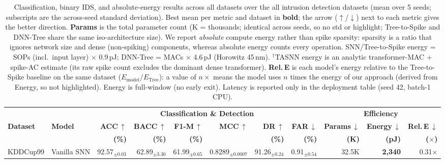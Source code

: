 \begin{table}[!ht]
\centering
\renewcommand{\arraystretch}{1.1}
\caption{Classification, binary IDS, and absolute-energy results across all datasets over the all intrusion detection datasets (mean over 5 seeds; subscripts are the across-seed standard deviation). Best mean per metric and dataset in \colorbox{bestcell}{\textbf{bold}}; the arrow ($\uparrow$/$\downarrow$) next to each metric gives the better direction. \textbf{Params} is the total parameter count (K = thousands; identical across seeds, so no std or highlight; Tree-to-Spike and DNN-Tree share the same iso-architecture size). We report \emph{absolute} compute energy rather than spike sparsity: sparsity is a ratio that ignores network size and dense (non-spiking) components, whereas absolute energy counts every operation. SNN/Tree-to-Spike energy = SOPs (incl.\ input layer) $\times$ 0.9\,pJ; DNN-Tree = MACs $\times$ 4.6\,pJ (Horowitz 45\,nm). $^\dagger$TASNN energy is an analytic transformer-MAC + spike-AC estimate (its raw spike count excludes the dominant dense transformer). \textbf{Rel.\,E} is each model's energy relative to the Tree-to-Spike baseline on the same dataset ($E_{\mathrm{model}}/E_{\mathrm{Tree}}$): a value of $n\times$ means the model uses $n$ times the energy of our approach (derived from Energy, so not highlighted). Energy is full-window (no early exit). Latency is reported only in the deployment table (seed 42, batch-1 CPU).}
\label{tab:results_full}
{\scriptsize
\begin{tabular}{l l r r r r r r r r r}
\toprule
& & \multicolumn{6}{c}{\textbf{Classification \& Detection}} & \multicolumn{3}{c}{\textbf{Efficiency}} \\
\cmidrule(lr){3-8} \cmidrule(lr){9-11}
\textbf{Dataset} & \textbf{Model} & \textbf{ACC}\,$\uparrow$ & \textbf{BACC}\,$\uparrow$ & \textbf{F1-M}\,$\uparrow$ & \textbf{MCC}\,$\uparrow$ & \textbf{DR}\,$\uparrow$ & \textbf{FAR}\,$\downarrow$ & \textbf{Params}\,$\downarrow$ & \textbf{Energy}\,$\downarrow$ & \textbf{Rel.\,E}\,$\downarrow$ \\
& & \textbf{(\%)} & \textbf{(\%)} & \textbf{(\%)} & & \textbf{(\%)} & \textbf{(\%)} & \textbf{(K)} & \textbf{(pJ)} & \textbf{($\times$)} \\
\midrule
\multirow{4}{*}{KDDCup99}
& Vanilla SNN   & 92.57$_{\pm0.03}$ & 62.89$_{\pm3.30}$ & 61.99$_{\pm0.65}$ & 0.8289$_{\pm0.0007}$ & 91.26$_{\pm0.24}$ & 0.91$_{\pm0.54}$ & 32.5K & \cellcolor{bestcell}\textbf{2,340} & 0.31$\times$ \\

\end{tabular}}
\end{table}
